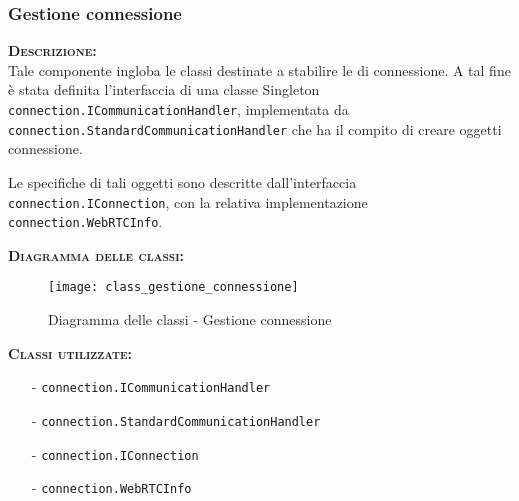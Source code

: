 \subsubsection{Gestione connessione}
\begin{description}
	\item{\scshape\bfseries Descrizione:}\\
Tale componente ingloba le classi destinate a stabilire le  di connessione. A tal fine è stata definita l'interfaccia di una classe Singleton \texttt{connection.ICommunicationHandler}, implementata da \texttt{connection.StandardCommunicationHandler} che ha il compito di creare oggetti connessione.

Le specifiche di tali oggetti sono descritte dall'interfaccia \texttt{connection.IConnection}, con la relativa implementazione \texttt{connection.WebRTCInfo}.
	\item{\scshape\bfseries Diagramma delle classi:}
	\begin{figure}[H]
\begin{center}
\texttt{[image: class\_gestione\_connessione]}
\caption{Diagramma delle classi - Gestione connessione}\label{fig:gestione_connessione}
\end{center}
\end{figure}
	
	\item{\scshape\bfseries Classi utilizzate:}
	\begin{itemize}[nolistsep, noitemsep]
	  \item[-] \texttt{connection.ICommunicationHandler}
	  \item[-] \texttt{connection.StandardCommunicationHandler}
	  \item[-] \texttt{connection.IConnection}
	  \item[-] \texttt{connection.WebRTCInfo}
	\end{itemize}
\end{description}

